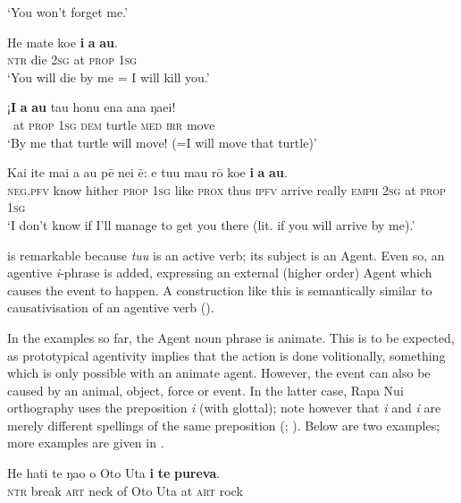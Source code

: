 \glt 
‘You won’t forget me.’ \textstyleExampleref{[R226.006]} 
\z

\ea\label{ex:8.157}
\gll He mate koe \textbf{i} \textbf{a} \textbf{au}. \\
\textsc{ntr} die \textsc{2sg} at \textsc{prop} \textsc{1sg} \\

\glt 
‘You will die by me = I will kill you.’ \textstyleExampleref{[Mtx-3-01.147]}
\z

\ea\label{ex:8.158}
\gll ¡\textbf{I} \textbf{a} \textbf{au} tau honu ena ana ŋae{\ꞌ}i!\\
~at \textsc{prop} \textsc{1sg} \textsc{dem} turtle \textsc{med} \textsc{irr} move\\

\glt 
‘By me that turtle will move! (=I will move that turtle)’ \textstyleExampleref{[MsE-028.002]}
\z

\ea\label{ex:8.159}
\gll Kai {\ꞌ}ite mai a au pē nei ē: e tu{\ꞌ}u mau rō koe \textbf{i} \textbf{a} \textbf{au}. \\
\textsc{neg.pfv} know hither \textsc{prop} \textsc{1sg} like \textsc{prox} thus \textsc{ipfv} arrive really \textsc{emph} \textsc{2sg} at \textsc{prop} \textsc{1sg} \\

\glt
‘I don’t know if I’ll manage to get you there (lit. if you will arrive by me).’ \textstyleExampleref{[R314.049]} 
\z

	 is remarkable because \textit{tu{\ꞌ}u} is an active verb; its subject is an Agent. Even so, an agentive \textit{i}{}-phrase is added, expressing an external (higher order) Agent which causes the event to happen. A construction like this is semantically similar to causativisation of an agentive verb ().

In the examples so far, the Agent noun phrase is animate. This is to be expected, as prototypical agentivity implies that the action is done volitionally, something which is only possible with an animate agent. However, the event can also be caused by an animal, object, force or event. In the latter case, Rapa Nui orthography uses the preposition \textit{{\ꞌ}i} (with glottal); note however that \textit{i} and \textit{{\ꞌ}i} are merely different spellings of the same preposition (; ). Below are two examples; more examples are given in .

\ea\label{ex:8.160}
\gll He hati te ŋao o {\ꞌ}Oto {\ꞌ}Uta \textbf{{\ꞌ}i} \textbf{te} \textbf{pureva}. \\
\textsc{ntr} break \textsc{art} neck of Oto Uta at \textsc{art} rock \\

